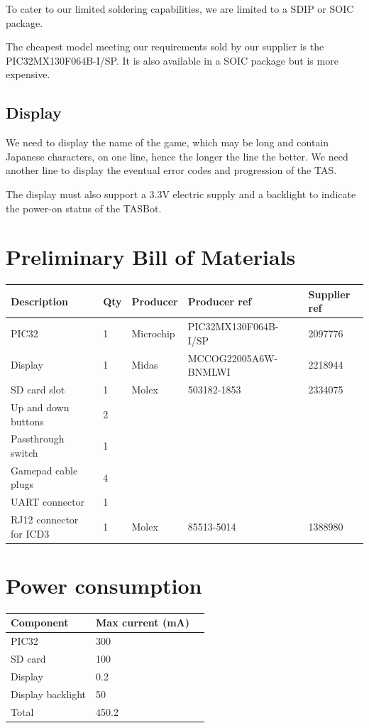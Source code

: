 \documentclass[a4paper,oneside,12pt]{article}
\begin{document}
To cater to our limited soldering capabilities, we are limited to a SDIP or
SOIC package.

The cheapest model meeting our requirements sold by our supplier is the
PIC32MX130F064B-I/SP. It is also available in a SOIC package but is more
expensive.

\subsection{Display}
We need to display the name of the game, which may be long and contain Japanese
characters, on one line, hence the longer the line the better. We need another
line to display the eventual error codes and progression of the TAS.

The display must also support a 3.3V electric supply and a backlight to indicate
the power-on status of the TASBot.

\section{Preliminary Bill of Materials}
\begin{tabular}{|l|l|l|l|l|}
  \hline
  Description & Qty & Producer & Producer ref & Supplier ref \\
  \hline
  PIC32 & 1 & Microchip & PIC32MX130F064B-I/SP & 2097776 \\
  \hline
  Display & 1 & Midas & MCCOG22005A6W-BNMLWI & 2218944 \\
  \hline
  SD card slot & 1 & Molex & 503182-1853 & 2334075 \\
  \hline
  Up and down buttons & 2 & & &\\
  \hline
  Passthrough switch & 1 & & &\\
  \hline
  Gamepad cable plugs & 4 & & &\\
  \hline
  UART connector & 1 & & &\\
  \hline
  RJ12 connector for ICD3 & 1 & Molex & 85513-5014 & 1388980 \\
  \hline
\end{tabular}

\section{Power consumption}
\begin{tabular}{|l|l|l|}
  \hline
  Component & Max current (\si{\mA}) \\
  \hline
  PIC32 & 300 \\
  \hline
  SD card & 100\\
  \hline
  Display & 0.2 \\
  \hline
  Display backlight & 50 \\
  \hline
  Total & 450.2\\
  \hline
\end{tabular}
\end{document}
